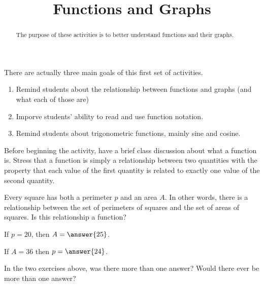 \documentclass{ximera}
\title{Functions and Graphs}
\begin{document}
\begin{abstract}
The purpose of these activities is to better understand functions and their graphs.
\end{abstract}
\maketitle



\begin{instnote}
There are actually three main goals of this first set of activities.

\begin{enumerate}
\item Remind students about the relationship between functions and graphs (and what each of those are)
\item Imporve students' ability to read and use function notation.
\item Remind students about trigonometric functions, mainly sine and cosine.
\end{enumerate}

Before beginning the activity, have a brief class discussion about what a function is.  Stress that a function is simply a relationship between two quantities with the property that each value of the first quantity is related to exactly one value of the second quantity.

\end{instnote}


Every square has both a perimeter $p$ and an area $A$.  In other words, there is a relationship between the set of perimeters of squares and the set of areas of squares.  Is this relationship a function?

\begin{exercise}
If $p = 20$, then $A = \answer{25}$.
\end{exercise}

\begin{exercise}
If $A = 36$ then $p = \answer{24}$.
\end{exercise}

In the two exercises above, was there more than one answer?  Would there ever be more than one answer?
\end{document}
